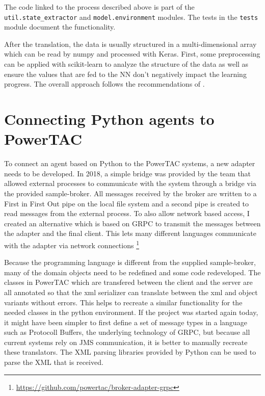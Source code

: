 The code linked to the process described above is part of the \texttt{util.state\_extractor} and
\texttt{model.environment} modules. The tests in the \texttt{tests} module document the functionality.

After the translation, the data is usually structured in a multi-dimensional array which can be read by numpy and
processed with Keras. First, some preprocessing can be applied with scikit-learn to analyze the structure of the data as
well as ensure the values that are fed to the \ac {NN} don't negatively impact the learning progress. The overall
approach follows the recommendations of \citet{Goodfellow-et-al-2016}.  

\section{Connecting Python agents to PowerTAC}

To connect an agent based on Python to the \ac{PowerTAC} systems, a new adapter needs to be developed. In 2018, a simple
bridge was provided by the team that allowed external processes to communicate with the system through a bridge via the
provided sample-broker. All messages received by the broker are written to a First in First Out pipe on the local file
system and a second pipe is created to read messages from the external process. To also allow network based access, I
created an alternative which is based on \ac{GRPC} to transmit the messages between the adapter and the final client.
This lets many different languages communicate with the adapter via network connections
\footnote{\url{https://github.com/powertac/broker-adapter-grpc} }

Because the programming language is different from the supplied sample-broker, many of the domain objects need to be redefined and some code redeveloped. The classes in \ac {PowerTAC} which are transfered between the client and the server are all annotated so that the xml serializer can translate between the xml and object variants without errors. This helps to recreate a similar functionality for the needed classes in the python environment. If the project was started again today, it might have been simpler to first define a set of message types in a language such as Protocoll Buffers, the underlying technology of \ac {GRPC}, but because all current systems rely on \ac {JMS} communication, it is better to manually recreate these translators. The \ac {XML} parsing libraries provided by Python can be used to parse the \ac {XML} that is received.
